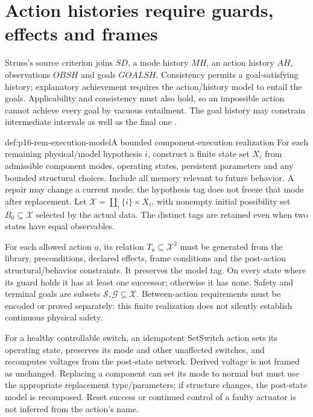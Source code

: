 \section{Action histories require guards, effects and frames}
\label{sec:p16-rem-execution}

Struss's source criterion joins \(SD\), a mode history \(MH\), an
action history \(AH\), observations \(OBSH\) and goals \(GOALSH\).
Consistency permits a goal-satisfying history; explanatory achievement
requires the action/history model to entail the goals. Applicability and
consistency must also hold, so an impossible action cannot achieve every
goal by vacuous entailment. The goal history may constrain intermediate
intervals as well as the final one
\cite[Definition~10.18, p.~449]{Struss2008ModelBasedProblemSolving}.

\begin{hbdefinition}{def:p16-rem-execution-model}{A bounded component-execution realization}
For each remaining physical/model hypothesis \(i\), construct a finite
state set \(X_i\) from admissible component modes, operating states,
persistent parameters and any bounded structural choices. Include all
memory relevant to future behavior. A repair may change a current mode;
the hypothesis tag does not freeze that mode after replacement.
Let \(\mathcal X=\coprod_i\{i\}\times X_i\), with nonempty initial
possibility set \(B_0\subseteq\mathcal X\) selected by the actual data.
The distinct tags are retained even when two states have equal observables.

For each allowed action \(a\), its relation \(T_a\subseteq\mathcal X^2\)
must be generated from the library, preconditions, declared effects,
frame conditions and the post-action structural/behavior constraints.
It preserves the model tag. On every state where its guard holds it has
at least one successor; otherwise it has none. Safety and terminal goals
are subsets \(\mathcal S,\mathcal G\subseteq\mathcal X\).
Between-action requirements must be encoded or proved separately: this
finite realization does not silently establish continuous physical safety.
\end{hbdefinition}

For a healthy controllable switch, an idempotent SetSwitch action sets its
operating state, preserves its mode and other unaffected switches, and
recomputes voltages from the post-state network. Derived voltage is not
framed as unchanged. Replacing a component can set its mode to normal but
must use the appropriate replacement type/parameters; if structure changes,
the post-state model is recomposed. Reset success or continued control of
a faulty actuator is not inferred from the action's name.

